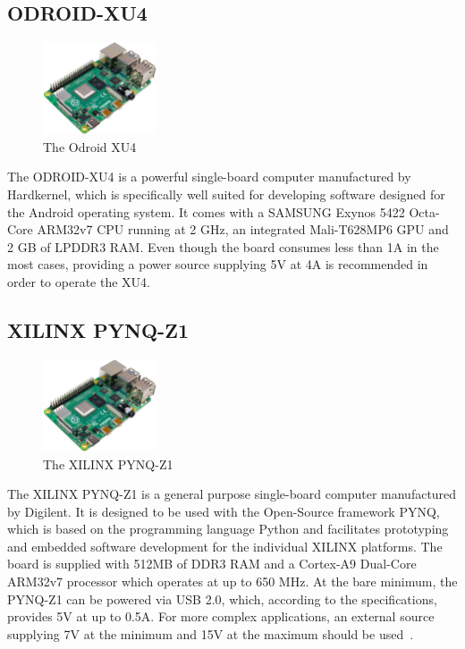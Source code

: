 \subsection{ODROID-XU4}

\begin{figure}[h]
    \centering
    \includegraphics[width=0.30\textwidth]{./figures/mesh}
    \caption{The Odroid XU4}
    \label{fig:odroid-xu4}
\end{figure}

The ODROID-XU4 is a powerful single-board computer manufactured by Hardkernel, which is specifically well suited for developing software designed for the Android operating system. It comes with a SAMSUNG Exynos 5422 Octa-Core ARM32v7 CPU running at 2 GHz, an integrated Mali-T628MP6 GPU and 2 GB of LPDDR3 RAM. Even though the board consumes less than 1A in the most cases, providing a power source supplying 5V at 4A is recommended in order to operate the XU4.~\parencite{odroid-xu4-manual}

\subsection{XILINX PYNQ-Z1}

\begin{figure}[h]
    \centering
    \includegraphics[width=0.30\textwidth]{./figures/mesh}
    \caption{The XILINX PYNQ-Z1}
    \label{fig:xilinx-pynq-z1}
\end{figure}

The XILINX PYNQ-Z1 is a general purpose single-board computer manufactured by Digilent. It is designed to be used with the Open-Source framework PYNQ, which is based on the programming language Python and facilitates prototyping and embedded software development for the individual XILINX platforms. The board is supplied with 512MB of DDR3 RAM and a Cortex-A9 Dual-Core ARM32v7 processor which operates at up to 650 MHz. At the bare minimum, the PYNQ-Z1 can be powered via USB 2.0, which, according to the specifications, provides 5V at up to 0.5A. For more complex applications, an external source supplying 7V at the minimum and 15V at the maximum should be used~\parencite{pynq-z1-manual}.